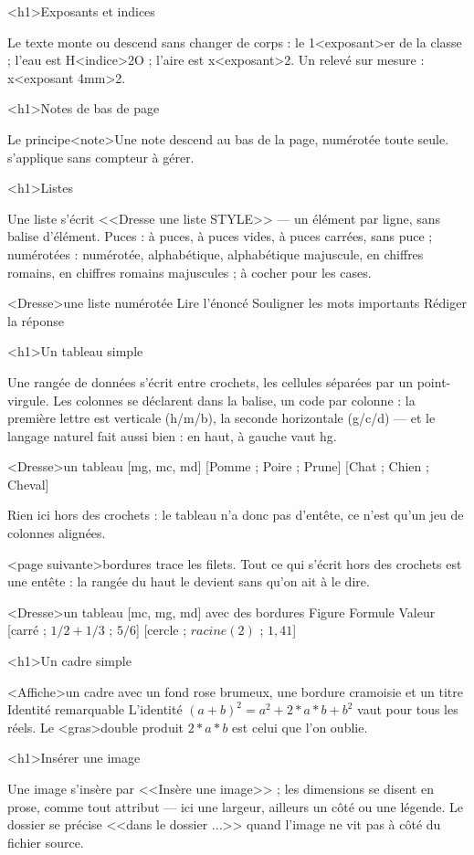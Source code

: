 \documentclass[marges=20, taille=11]{texecole}
\begin{document}
	<h1>Exposants et indices
	
	Le texte monte ou descend sans changer de corps : le 1<exposant>{er}
	de la classe ; l'eau est H<indice>{2}O ; l'aire est x<exposant>{2}.
	Un relevé sur mesure : x<exposant 4mm>{2}.
	
	<h1>Notes de bas de page
	
	Le principe<note>{Une note descend au bas de la page, numérotée toute
		seule.} s'applique sans compteur à gérer.
	
	<h1>Listes
	
	Une liste s'écrit <<Dresse une liste STYLE>> — un élément par ligne, sans balise d'élément. Puces : à puces, à puces vides, à puces carrées, sans puce ;
	numérotées : numérotée, alphabétique, alphabétique majuscule, en chiffres romains, en chiffres romains majuscules ; à cocher pour les cases.
	
	<Dresse>une liste numérotée {
		Lire l'énoncé
		Souligner les mots importants
		Rédiger la réponse
	}
	
	<h1>Un tableau simple
	
	Une rangée de données s'écrit entre crochets, les cellules séparées par un point-virgule. Les colonnes se déclarent dans la balise, un code par colonne : la première lettre est verticale (h/m/b), la seconde horizontale (g/c/d) — et le langage naturel fait aussi bien : en haut, à gauche vaut hg.
	
	<Dresse>un tableau [mg, mc, md] {
		[Pomme ; Poire ; Prune]
		[Chat ; Chien ; Cheval]
	}
	
	Rien ici hors des crochets : le tableau n'a donc pas d'entête, ce n'est qu'un jeu de colonnes alignées.
	
	<page suivante>bordures trace les filets. Tout ce qui s'écrit hors des crochets est une entête : la rangée du haut le devient sans qu'on ait à le dire.
	
	<Dresse>un tableau [mc, mg, md] avec des bordures {
		Figure	Formule	Valeur
		[carré ; $1/2 + 1/3$ ; $5/6$]
		[cercle ; $racine(2)$ ; $1,41$]
	}
	
	<h1>Un cadre simple
	
	<Affiche>un cadre avec un fond rose brumeux, une bordure cramoisie et un titre {Identité remarquable} {
		L'identité $(a + b)^2 = a^2 + 2*a*b + b^2$ vaut pour tous les réels.
		Le <gras>{double produit} $2*a*b$ est celui que l'on oublie.
	}
	
	<h1>Insérer une image
	
	Une image s'insère par <<Insère une image>> ; les dimensions se disent en prose, comme tout attribut — ici une largeur, ailleurs un côté ou une légende. Le dossier se précise <<dans le dossier {...}>> quand l'image ne vit pas à côté du fichier source.
	
\end{document}
